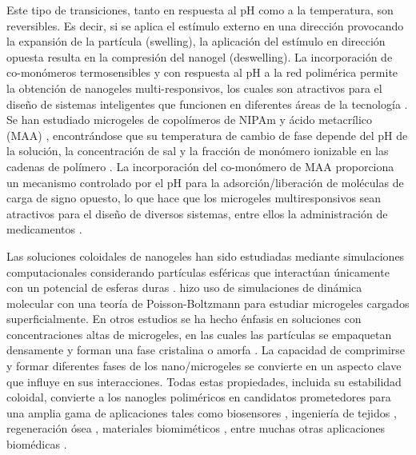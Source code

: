 	Este tipo de  transiciones, tanto en respuesta al pH como a la temperatura, son reversibles. Es decir, si se aplica el est\'imulo externo en una direcci\'on provocando la expansi\'on de la part\'icula (swelling), la aplicaci\'on del est\'imulo en direcci\'on opuesta resulta en la compresi\'on del nanogel (deswelling).
	La incorporaci\'on de co-mon\'omeros termosensibles y con respuesta al pH a la red polim\'erica permite la obtenci\'on de nanogeles multi-responsivos, los cuales son atractivos para el dise\~no de sistemas inteligentes que funcionen en diferentes \'areas de la tecnolog\'ia \cite{plamper2017functional}. Se han estudiado microgeles de copol\'imeros de NIPAm y \'acido metacr\'ilico (MAA) \cite{Dowding2000, Hoare2004, Giussi2015}, encontr\'andose que su temperatura de cambio de fase depende del pH de la soluci\'on, la concentraci\'on de sal y la fracci\'on de mon\'omero ionizable en las cadenas de pol\'imero \cite{Morris1997, Jones2000, Hoare2004, Bradley2005, Lee2008, Wong2009, Hamzavi2016}. La incorporaci\'on del co-mon\'omero de MAA proporciona un mecanismo controlado por el pH para la adsorci\'on/liberaci\'on de mol\'eculas de carga de signo opuesto, lo que hace que los microgeles multiresponsivos sean atractivos para el dise\~no de diversos sistemas, entre ellos la administraci\'on de medicamentos \cite{Liu2017}.
	
	Las soluciones coloidales de nanogeles han sido estudiadas mediante simulaciones computacionales considerando  part\'iculas esf\'ericas que interact\'uan \'unicamente con un potencial de esferas duras \cite{karg2019nanogels}.
	 \citet{alziyadi2023osmotic} hizo uso de simulaciones de din\'amica molecular con una teor\'ia de Poisson-Boltzmann para estudiar microgeles cargados superficialmente. En otros estudios se ha hecho \'enfasis en soluciones con concentraciones altas de microgeles, en las cuales las part\'iculas se empaquetan densamente y forman una fase cristalina o amorfa  \cite{scotti2022softness, scheffold2020pathways}. La capacidad de comprimirse y formar diferentes fases de los nano/microgeles se convierte en un aspecto clave que influye en sus interacciones.
	Todas estas propiedades, incluida su estabilidad coloidal, convierte a los nanogles polim\'ericos en candidatos prometedores para una amplia gama de aplicaciones tales como biosensores \cite{zhang2012ultrathin, islam2014responsive}, ingenier\'ia de tejidos \cite{matricardi2013interpenetrating, van2011biopolymer}, regeneraci\'on \'osea \cite{bai2018bioactive}, materiales biomim\'eticos \cite{green2016mimicking, wu2010multifunctional}, entre muchas otras aplicaciones biom\'edicas \cite{Daly2020}.
	
